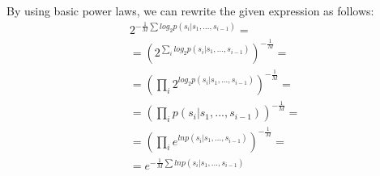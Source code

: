 By using basic power laws, we can rewrite the given expression as follows:
\begin{align*}
    &2^{-\frac{1}{M}\sum log_2 p(s_i | s_1,...,s_{i-1})}= \\
&= (2^{\sum_i log_2 p(s_i | s_1,...,s_{i-1})})^{-\frac{1}{M}}= \\
&= (\prod_i 2^{log_2 p(s_i | s_1,...,s_{i-1})})^{-\frac{1}{M}}= \\
&= (\prod_i  p(s_i | s_1,...,s_{i-1}))^{-\frac{1}{M}}= \\
&= (\prod_i e^{ln p(s_i | s_1,...,s_{i-1})})^{-\frac{1}{M}}= \\
&= e^{-\frac{1}{M}\sum ln p(s_i | s_1,...,s_{i-1})}
\end{align*}